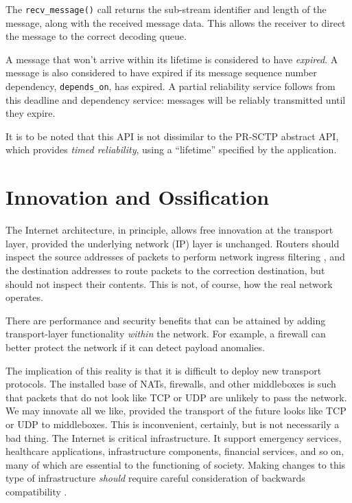 \documentclass{sig-alternate-05-2015}
\newcommand{\todo}[1]{\textbf{\textcolor{red}{To do -- #1}}}
\begin{document}
    The \texttt{recv\_message()} call returns the sub-stream identifier and
    length of the message, along with the received message data. This allows 
    the receiver to direct the message to the correct decoding queue.




A message that won't arrive within its lifetime is considered to have
\emph{expired}. A message is also considered to have expired if its
message sequence number dependency, \texttt{depends\_on},
has expired. A partial reliability service follows
from this deadline and dependency service: messages will be reliably
transmitted until they expire.

It is to be noted that this API is not dissimilar to the PR-SCTP abstract
API, which provides \textit{timed reliability}, using a ``lifetime''
specified by the application.

\section{Innovation and Ossification}
\label{sec:ossification}

The Internet architecture, in principle, allows free innovation at the
transport layer, provided the underlying network (IP) layer is unchanged.
Routers should inspect the source addresses of packets to perform network
ingress filtering \cite{rfc:2827}, and the destination addresses to route
packets to the correction destination, but should not inspect their
contents. This is not, of course, how the real network operates.

There are performance and security benefits that can be attained by
adding transport-layer functionality \emph{within} the network. For
example, a firewall can better protect the network if it can detect payload
anomalies.

The implication of this reality is that it is difficult to deploy new
transport protocols. The installed base of NATs, firewalls, and other
middleboxes is such that packets that do not look like TCP or UDP are
unlikely to pass the network. We may innovate all we like, provided the
transport of the future looks like TCP or UDP to middleboxes.
  This is inconvenient, certainly, but is not necessarily a bad thing.
  The Internet is critical infrastructure. It support emergency services,
  healthcare applications, infrastructure components, financial services,
  and so on, many of which are essential to the functioning of society.
  Making changes to this type of infrastructure \emph{should} require
  careful consideration of backwards compatibility \cite{mcquistin:2015:reinterpreting}.
\end{document}
